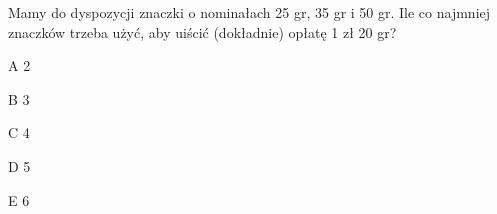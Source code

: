 \begin{tresc}
Mamy do dyspozycji znaczki o nominałach 25 gr, 35 gr i 50 gr. Ile co najmniej znaczków trzeba użyć, aby uiścić (dokładnie) opłatę 1 zł 20 gr?
\end{tresc}
\begin{wariant}{A} 2 \end{wariant}
\begin{wariant}{B} 3 \end{wariant}
\begin{wariant}{C} 4 \end{wariant}
\begin{wariant}{D} 5 \end{wariant}
\begin{wariant}{E} 6 \end{wariant}
